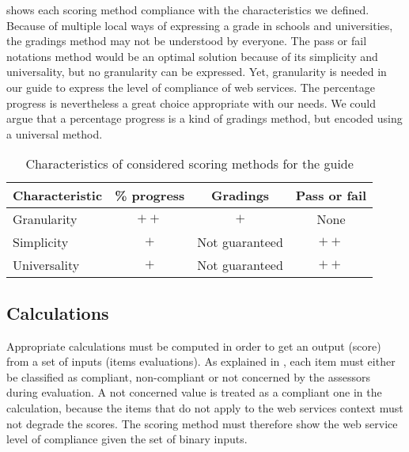  shows each scoring method compliance with the characteristics we defined. Because of multiple local ways of expressing a grade in schools and universities, the gradings method may not be understood by everyone. The pass or fail notations method would be an optimal solution because of its simplicity and universality, but no granularity can be expressed. Yet, granularity is needed in our guide to express the level of compliance of web services. The percentage progress is nevertheless a great choice appropriate with our needs. We could argue that a percentage progress is a kind of gradings method, but encoded using a universal method.

\begin{table}[ht]
    \begin{center}
        \begin{tabular}{l|ccc}
            \toprule[0.8mm]
            \textbf{Characteristic} & \textbf{\% progress} & \textbf{Gradings} & \textbf{Pass or fail} \\ 
            \midrule[0.8mm]
            Granularity & $\pmb{++}$ & $\pmb{+}$ & None \\
            Simplicity & $\pmb{+}$ & Not guaranteed & $\pmb{++}$ \\
            Universality & $\pmb{+}$ & Not guaranteed & $\pmb{++}$ \\
            \bottomrule[0.8mm]
        \end{tabular}
    \end{center}
    \caption{Characteristics of considered scoring methods for the guide}
    \label{table:proposal_scoring_methods_characteristics}
\end{table}

\subsection{Calculations}
\label{subsec:proposal_scoring_calculations}

Appropriate calculations must be computed in order to get an output (score) from a set of inputs (items evaluations). As explained in , each item must either be classified as compliant, non-compliant or not concerned by the assessors during evaluation. A not concerned value is treated as a compliant one in the calculation, because the items that do not apply to the web services context must not degrade the scores. The scoring method must therefore show the web service level of compliance given the set of binary inputs.

